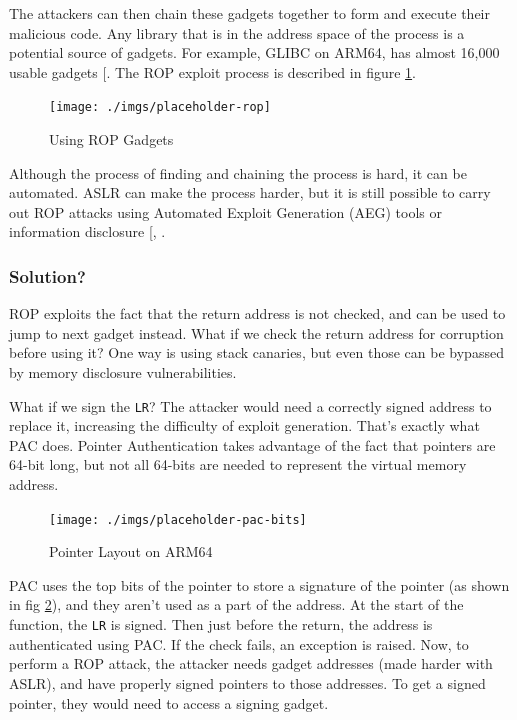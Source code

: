 \documentclass[a4paper, nobind]{templates/ociamthesis}
\begin{document}
The attackers can then chain these gadgets together to form and execute their malicious code.
Any library that is in the address space of the process is a potential source of gadgets.
For example, GLIBC on ARM64, has almost 16,000 usable gadgets {[}\citeproc{ref-riscyrop}{23}{]}.
The ROP exploit process is described in figure \ref{fig:rop-diag}.

\begin{figure}

{\centering \texttt{[image: ./imgs/placeholder-rop]} 

}

\caption{Using ROP Gadgets}\label{fig:rop-diag}
\end{figure}

Although the process of finding and chaining the process is hard, it can be automated.
ASLR can make the process harder, but it is still possible to carry out ROP attacks using
Automated Exploit Generation (AEG) tools or information disclosure {[}, \citeproc{ref-riscyrop}{23}{]}.

\subsubsection{Solution?}\label{solution}

ROP exploits the fact that the return address is not checked, and can be used to
jump to next gadget instead. What if we check the return address for corruption
before using it? One way is using stack canaries, but even those can be bypassed
by memory disclosure vulnerabilities.

What if we sign the \texttt{LR}? The attacker would need a correctly signed address to replace it,
increasing the difficulty of exploit generation.
That's exactly what PAC does. Pointer Authentication
takes advantage of the fact that pointers are 64-bit long, but not all 64-bits
are needed to represent the virtual memory address.

\begin{figure}

{\centering \texttt{[image: ./imgs/placeholder-pac-bits]} 

}

\caption{Pointer Layout on ARM64}\label{fig:pac-bits}
\end{figure}

PAC uses the top bits of the pointer to store a signature of the pointer
(as shown in fig \ref{fig:pac-bits}), and they aren't
used as a part of the address. At the start of the function, the \texttt{LR} is signed.
Then just before the return, the address is authenticated using PAC. If the check fails,
an exception is raised. Now, to perform a ROP attack, the attacker needs gadget addresses
(made harder with ASLR), and have properly signed pointers to those addresses.
To get a signed pointer, they would need to access a signing gadget.
\end{document}
